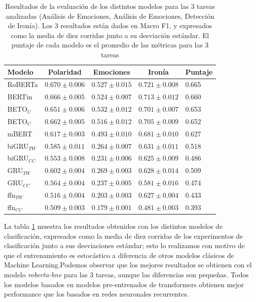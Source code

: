 \begin{table}[t]
    \centering
    \large
    \begin{tabular}{l ccc l}
        \toprule
        Modelo         &  Polaridad         & Emociones         &   Ironía        &  Puntaje \\
        \hline
        RoBERTa        &  $0.670 \pm 0.006$ &  $0.527 \pm 0.015$& $0.721 \pm 0.008$ &  0.665 \\
        BERTin         &  $0.666 \pm 0.005$ &  $0.524 \pm 0.007$& $0.713 \pm 0.012$ &  0.660 \\
        BETO$_U$       &  $0.651 \pm 0.006$ &  $0.532 \pm 0.012$& $0.701 \pm 0.007$ &  0.653 \\
        BETO$_C$       &  $0.662 \pm 0.005$ &  $0.516 \pm 0.012$& $0.705 \pm 0.009$ &  0.652 \\
        mBERT          &  $0.617 \pm 0.003$ &  $0.493 \pm 0.010$& $0.681 \pm 0.010$ &  0.627 \\
        \hline
        biGRU$_{TW}$   &  $0.585 \pm 0.011$ &  $0.264 \pm 0.007$& $0.631 \pm 0.011$ &  0.518 \\
        biGRU$_{CC}$   &  $0.553 \pm 0.008$ &  $0.231 \pm 0.006$& $0.625 \pm 0.009$ &  0.486 \\
        GRU$_{TW}$     &  $0.602 \pm 0.004$ &  $0.269 \pm 0.003$& $0.628 \pm 0.014$ &  0.509 \\
        GRU$_{CC}$     &  $0.564 \pm 0.004$ &  $0.237 \pm 0.005$& $0.581 \pm 0.016$ &  0.474 \\
        ffn$_{TW}$     &  $0.516 \pm 0.004$ &  $0.203 \pm 0.003$& $0.627 \pm 0.004$ &  0.433 \\
        ffn$_{CC}$     &  $0.509 \pm 0.003$ &  $0.179 \pm 0.001$& $0.481 \pm 0.003$ &  0.393 \\
        \hline
    \end{tabular}
    \caption{Resultados de la evaluación de los distintos modelos para las 3 tareas analizadas (Análisis de Emociones, Análisis de Emociones, Detección de Ironía). Los 3 resultados están dados en Macro F1, y expresados como la media de diez corridas junto a su desviación estándar. El puntaje de cada modelo es el promedio de las métricas para las 3 tareas}
    \label{tab:03_classification_results}
\end{table}

La tabla \ref{tab:03_classification_results} muestra los resultados obtenidos con los distintos modelos de clasificación, expresados como la media de diez corridas de los experimentos de clasificación junto a sus desviaciones estándar; esto lo realizamos con motivo de que el entrenamiento es estocástico a diferencia de otros modelos clásicos de Machine Learning.Podemos observar que los mejores resultados se obtienen con el modelo \emph{roberta-bne} para las 3 tareas, aunque las diferencias son pequeñas. Todos los modelos basados en modelos pre-entrenados de transformers obtienen mejor performance que los basados en redes neuronales recurrentes.

